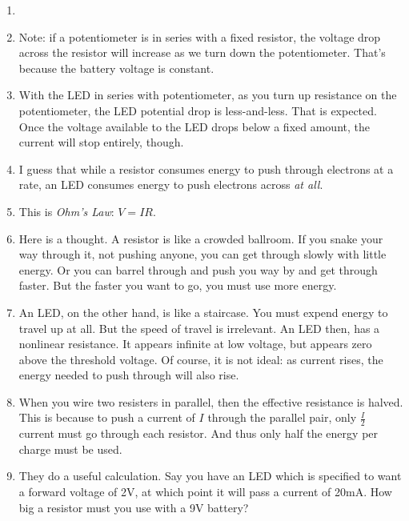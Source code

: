 \documentclass[11pt, oneside]{amsart}
\begin{document}
\begin{enumerate}
  \item {}

  \item Note: if a potentiometer is in series with a fixed resistor, the
  voltage drop across the resistor will increase as we turn down the
  potentiometer. That's because the battery voltage is constant.

  \item With the LED in series with potentiometer, as you turn up
  resistance on the potentiometer, the LED potential drop is
  less-and-less. That is expected. Once the voltage available to the LED
  drops below a fixed amount, the current will stop entirely, though.

  \item I guess that while a resistor consumes energy to push through
  electrons at a rate, an LED consumes energy to push electrons across
  \emph{at all}.

  \item This is \emph{Ohm's Law}: $V = IR$.

  \item Here is a thought. A resistor is like a crowded ballroom. If you
  snake your way through it, not pushing anyone, you can get through
  slowly with little energy. Or you can barrel through and push you way
  by and get through faster. But the faster you want to go, you must use
  more energy.

  \item An LED, on the other hand, is like a staircase. You must expend
  energy to travel up at all. But the speed of travel is irrelevant. An
  LED then, has a nonlinear resistance. It appears infinite at low
  voltage, but appears zero above the threshold voltage. Of course, it
  is not ideal: as current rises, the energy needed to push through will
  also rise.

  \item When you wire two resisters in parallel, then the effective
  resistance is halved. This is because to push a current of $I$ through
  the parallel pair, only $\frac{I}{2}$ current must go through each
  resistor. And thus only half the energy per charge must be used.

  \item They do a useful calculation. Say you have an LED which is
  specified to want a forward voltage of 2V, at which point it will pass
  a current of 20mA. How big a resistor must you use with a 9V battery?


\end{enumerate}
\end{document}
